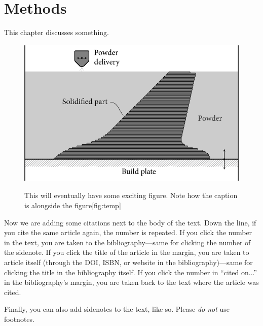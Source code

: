 \chapter{Methods}\label{chap:methods}

This
%
chapter discusses something. \lipsum[1]

\begin{figure}[ht]
   \begin{fullwidthfig}
     \includegraphics[width=0.9\fullwidth]{figures/example/powder_based}
   \end{fullwidthfig}
\end{figure}

 \lipsum[2]

 \begin{figure}[ht]
   \begin{sidecaption}{This will eventually have some exciting figure. Note how the caption is alongside the figure}[fig:temp]
     \todofig
   \end{sidecaption}
 \end{figure}

Now we are adding some citations next to the body of the text.
\lipsum[3]
Down the line, if you cite the same article again, the number is repeated.
If you click the number in the text, you are taken to the bibliography---same for clicking the number of the sidenote.
If you click the title of the article in the margin, you are taken to article itself (through the DOI, ISBN, or website in the bibliography)---same for clicking the title in the bibliography itself.
If you click the number in ``cited on...'' in the bibliography's margin, you are taken back to the text where the article was cited.

Finally, you can also add sidenotes to the text, like so.
Please \textit{do not} use footnotes.

